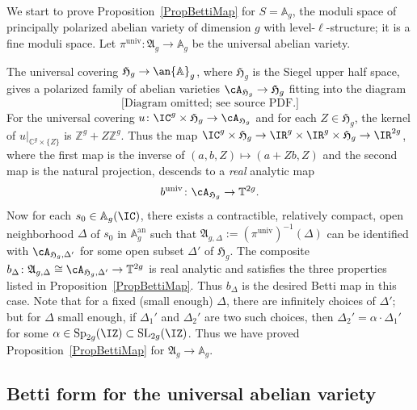 We start to prove Proposition~\ref{PropBettiMap} for $S = \mathbb
A_g$, the moduli space of principally polarized abelian variety of
dimension $g$ with level-$\ell$-structure;  it is a fine moduli
space. Let $\pi^{\mathrm{univ}} \colon \mathfrak{A}_g \rightarrow \mathbb A_g$ be the universal abelian variety.

The universal covering $\mathfrak{H}_g \rightarrow \an{\mathbb A}_g$,
where $\mathfrak{H}_g$ is the Siegel upper half space, gives a
polarized family of abelian varieties
$\cA_{\mathfrak{H}_g} \rightarrow \mathfrak{H}_g$ fitting into the diagram
\[
\text{[Diagram omitted; see source PDF.]}
\]
For the universal covering $u \colon \IC^g \times \mathfrak{H}_g
\rightarrow \cA_{\mathfrak{H}_g}$ and for each $Z \in
\mathfrak{H}_g$, the kernel of $u|_{\mathbb{C}^g \times \{Z\}}$ is
$\mathbb{Z}^g + Z \mathbb{Z}^g$. Thus the map $\IC^g \times
\mathfrak{H}_g \rightarrow \IR^g \times \IR^g \times
\mathfrak{H}_g \rightarrow \IR^{2g}$, where the first map is the
inverse of $(a,b,Z) \mapsto (a + Z  b,Z)$ and the second map is the
natural projection, descends to a \textit{real} analytic map
\[
b^{\mathrm{univ}} \colon \cA_{\mathfrak{H}_g} \rightarrow \mathbb T^{2g}.
\]
 Now for each $s_0 \in \mathbb A_g(\IC)$, there exists a contractible,
 relatively compact, open neighborhood $\Delta$ of $s_0$ in $\mathbb A_g^{\mathrm{an}}$ such that $\mathfrak{A}_{g,\Delta}:=(\pi^{\mathrm{univ}})^{-1}(\Delta)$ can be identified with $\cA_{\mathfrak{H}_g,\Delta'}$ for some open subset $\Delta'$ of $\mathfrak{H}_g$. The composite $b_{\Delta} \colon \mathfrak{A}_{g,\Delta} \cong \cA_{\mathfrak{H}_g,\Delta'} \rightarrow \mathbb T^{2g}$ is  real analytic and satisfies the three properties listed in Proposition~\ref{PropBettiMap}. Thus $b_{\Delta}$ is the desired Betti map in this case. Note that for a fixed (small enough) $\Delta$, there are infinitely choices of $\Delta'$; but for $\Delta$ small enough, if $\Delta_1'$ and $\Delta_2'$ are two such choices, then $\Delta_2' = \alpha \cdot \Delta_1'$ for some $\alpha \in \mathrm{Sp}_{2g}(\IZ) \subset \mathrm{SL}_{2g}(\IZ)$. Thus we have proved Proposition~\ref{PropBettiMap} for $\mathfrak{A}_g \rightarrow \mathbb A_g$.


\subsection{Betti form for the universal abelian variety}

\newcommand{\X}{X}
\newcommand{\Y}{Y}
\newcommand{\rmd}{\mathrm{d}}
\newcommand{\tran}[1]{{{#1}}^{\!^{\intercal}}}


